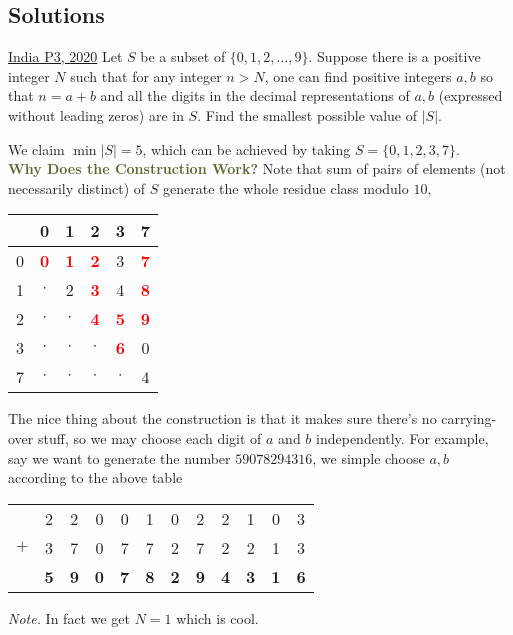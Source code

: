 \subsection{Solutions}
\begin{problem}{1}{\href{https://artofproblemsolving.com/community/c6h1989008p34732913}{India P3, 2020}}
	Let $S$ be a subset of $\{0,1,2,\dots ,9\}$. Suppose there is a positive integer $N$ such that for any integer $n>N$, one can find positive integers $a,b$ so that $n=a+b$ and all the digits in the decimal representations of $a,b$ (expressed without leading zeros) are in $S$. Find the smallest possible value of $|S|$.
	\begin{solution} We claim $\min |S|=5$, which can be achieved by taking $S=\{0,1,2,3,7\}$.\\

	\noindent\textcolor{darkolivegreen}{\textbf{Why Does the Construction Work?}} Note that sum of pairs of elements (not necessarily distinct) of $S$ generate the whole residue class modulo $10$,
	\begin{center}\begin{tabular}{c| c c  c c c}
& 0 & 1 & 2 & 3 & 7\\
\hline
0 & \textcolor{red}{\textbf{0}} & \textcolor{red}{\textbf{1}} & \textcolor{red}{\textbf{2}} & 3 & \textcolor{red}{\textbf{7}}\\ 
1 & $\cdot$ & 2 & \textcolor{red}{\textbf{3}} & 4 & \textcolor{red}{\textbf{8}}\\ 
2 & $\cdot$ & $\cdot$ & \textcolor{red}{\textbf{4}} & \textcolor{red}{\textbf{5}} & \textcolor{red}{\textbf{9}}\\ 
3 & $\cdot$ & $\cdot$ & $\cdot$ & \textcolor{red}{\textbf{6}} & 0\\ 
7 & $\cdot$ & $\cdot$ & $\cdot$ & $\cdot$ & 4\\ 
\end{tabular}\end{center}
	\indent The nice thing about the construction is that it makes sure there's no carrying-over stuff, so we may choose each digit of $a$ and $b$ independently. For example, say we want to generate the number $59078294316$, we simple choose $a,b$ according to the above table
	\begin{center}\begin{tabular}{c c c c c c c c c c c c}
        & 2 & 2 & 0 & 0 & 1 & 0 & 2 & 2 & 1 & 0 & 3\\
$+$ & 3 & 7 & 0 & 7 & 7 & 2 & 7 & 2 & 2 & 1 & 3\\
\hline
& \textbf{5} & \textbf{9} & \textbf{0} & \textbf{7} & \textbf{8} & \textbf{2} & \textbf{9} & \textbf{4} & \textbf{3} & \textbf{1} & \textbf{6}
\end{tabular}\end{center}
	\noindent \emph{Note.} In fact we get $N=1$ which is cool.\\


\end{solution}
\end{problem}
